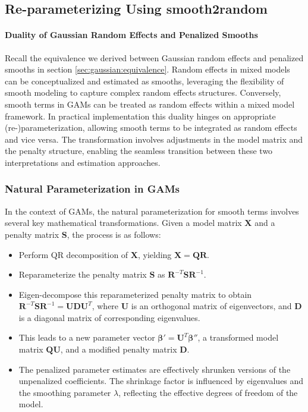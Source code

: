 \documentclass[12pt, twoside,hidelinks]{article}
\theoremstyle{definition}
\numberwithin{equation}{section}
\begin{document}
\subsection{Re-parameterizing Using smooth2random}\label{sec:makingsmooth:smooth2random}

\paragraph{Duality of Gaussian Random Effects and Penalized Smooths}\label{sec:smooths:re:parametrization}

Recall the equivalence we derived between Gaussian random effects and penalized smooths in section \ref{sec:gaussian:equivalence}. Random effects in mixed models can be conceptualized and estimated as smooths, leveraging the flexibility of smooth modeling to capture complex random effects structures. Conversely, smooth terms in GAMs can be treated as random effects within a mixed model framework. In practical implementation this duality hinges on appropriate (re-)parameterization, allowing smooth terms to be integrated as random effects and vice versa. The transformation involves adjustments in the model matrix and the penalty structure, enabling the seamless transition between these two interpretations and estimation approaches.

\subsubsection{Natural Parameterization in GAMs}\label{sec:makingsmooth:smooth2random:natparams}

In the context of GAMs, the natural parameterization for smooth terms involves several key mathematical transformations. Given a model matrix \( \mathbf{X} \) and a penalty matrix \( \mathbf{S} \), the process is as follows:

\begin{itemize}
  \item Perform QR decomposition of \( \mathbf{X} \), yielding \( \mathbf{X} = \mathbf{QR} \).
  \item Reparameterize the penalty matrix \( \mathbf{S} \) as \( \mathbf{R}^{-T}\mathbf{SR}^{-1} \).
  \item Eigen-decompose this reparameterized penalty matrix to obtain \( \mathbf{R}^{-T}\mathbf{SR}^{-1} = \mathbf{UDU}^T \), where \( \mathbf{U} \) is an orthogonal matrix of eigenvectors, and \( \mathbf{D} \) is a diagonal matrix of corresponding eigenvalues.
  \item This leads to a new parameter vector \( \boldsymbol{\beta'} = \mathbf{U}^T\boldsymbol{\beta''} \), a transformed model matrix \( \mathbf{QU} \), and a modified penalty matrix \( \mathbf{D} \).
  \item The penalized parameter estimates are effectively shrunken versions of the unpenalized coefficients. The shrinkage factor is influenced by eigenvalues and the smoothing parameter \( \lambda \), reflecting the effective degrees of freedom of the model.
\end{itemize}
\end{document}
